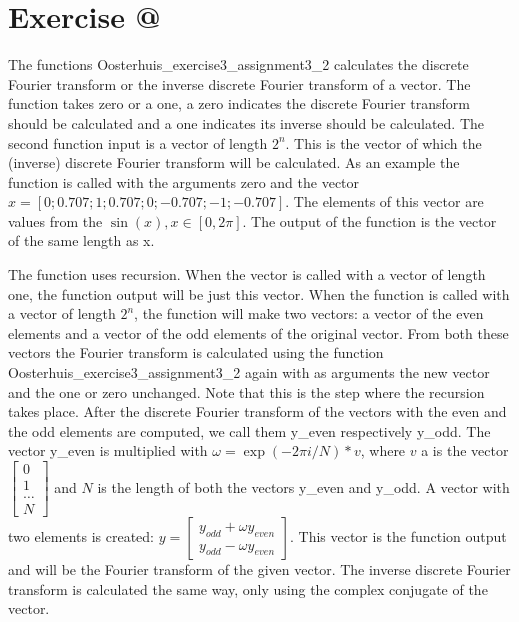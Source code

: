 \documentclass[12pt]{article}
\makeatletter
\newcommand*{\rom}[1]{\expandafter\@slowromancap\romannumeral #1@}
\makeatother
\begin{document}





\section*{Exercise \rom{3}}

The functions Oosterhuis\_exercise3\_assignment3\_2 calculates the discrete Fourier transform or the inverse discrete Fourier transform of a vector. The function takes zero or a one, a zero indicates the discrete Fourier transform should be calculated and  a one indicates its inverse should be calculated. The second function input is a vector of length $2^n$. This is the vector of which the (inverse) discrete Fourier transform will be calculated. As an example the function is called with the arguments zero and the vector $x = [0;0.707;1;0.707;0;-0.707;-1;-0.707]$. The elements of this vector are values from the $\sin(x), x\in[0,2\pi]$. The output of the function is the vector of the same length as x.

The function uses recursion. When the vector is called with a vector of length one, the function output will be just this vector. When the function is called with a vector of length $2^n$, the function will make two vectors: a vector of the even elements and a vector of the odd elements of the original vector. From both these vectors the Fourier transform is calculated using the function Oosterhuis\_exercise3\_assignment3\_2 again with as arguments the new vector and the one or zero unchanged. Note that this is the step where the recursion takes place. After the discrete Fourier transform of the vectors with the even and the odd elements are computed, we call them y\_even respectively y\_odd. The vector y\_even is multiplied with $\omega = \exp(-2 \pi i / N) * v $, where $v$ a is the vector $\begin{bmatrix} 0 \\ 1 \\ \dots \\ N \end{bmatrix} $ and $N$ is the length of both the vectors y\_even and y\_odd. A vector with two elements is created: $y = \begin{bmatrix} y_{odd} + \omega y_{even} \\ y_{odd} - \omega y_{even} \end{bmatrix}$. This vector is the function output and will be the Fourier transform of the given vector.
The inverse discrete Fourier transform is calculated the same way, only using the complex conjugate of the vector.%
\end{document}

